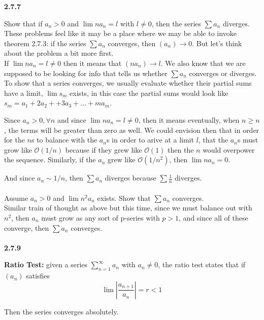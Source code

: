 \textbf{2.7.7}

Show that if $a_n > 0$ and $\lim na_n = l$ with $l\neq 0$, then
the series $\sum a_n$ diverges.
\\

These problems feel like it may be a place where we may be able to invoke theorem 2.7.3: if the series
$\sum a_n$ converges, then $(a_n) \rightarrow 0$.
But let's think about the problem a bit more first.
\\

If $\lim na_n = l \neq 0$ then it means that $(n a_n) \rightarrow l$.
We also know that we are supposed to be looking for info that tells us whether $\sum a_n$
converges or diverges.
To show that a series converges, we usually evaluate whether their partial sums have a limit,
$\lim s_m$ exists, in this case the partial sums would look like
$s_m = a_1 + 2a_2 + + 3a_3 + \ldots + ma_m$.

Since $a_n > 0, \forall n$ and since $\lim na_n = l \neq 0$, then it means eventually, when $n\geq n$,
the terms will be greater than zero as well.
We could envision then that in order for the $n$s to balance with the $a_n$s in order to arive at a
limit $l$, that the $a_n$s must grow like $\mathcal{O}(1/n)$ because if they grew like $\mathcal{O}(1)$ then the
$n$ would overpower the sequence.
Similarly, if the $a_n$ grew like $\mathcal{O}(1/n^2)$, then $\lim na_n = 0$.

And since $a_n \sim 1/n$, then $\sum a_n$ diverges because $\sum \frac{1}{n}$ diverges.
\\~\\

Assume $a_n > 0$ and $\lim n^2 a_n$ exists.
Show that $\sum a_n$ converges.
\\

Similar train of thought as above but this time, since we must balance out with $n^2$,
then $a_n$ must grow as any sort of p-series with $p>1$, and since all of these converge, then
$\sum a_n$ converges.
\\~\\




\textbf{2.7.9}

\textbf{Ratio Test:} given a series $\sum^{\infty}_{n=1} a_n$ with $a_n \neq 0$,
the ratio test states that if $(a_n)$ satisfies
$$
\lim \left| \frac{a_{n+1}}{a_n} \right| = r < 1
$$

Then the series converges absolutely.
\\

